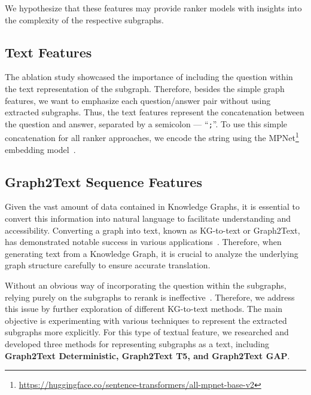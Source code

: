 \noindent We hypothesize that these features may provide ranker models with insights into the complexity of the respective subgraphs.


\subsection{Text Features}
\label{sec:controllable_fusion:text_features} 
The ablation study showcased the importance of including the question within the text representation of the subgraph. Therefore, besides the simple graph features, we want to emphasize each question/answer pair without using extracted subgraphs. Thus, the text features represent the concatenation between the question and answer, separated by a semicolon --- ``\texttt{;}''. To use this simple concatenation for all ranker approaches, we encode the string using the MPNet\footnote{\url{https://huggingface.co/sentence-transformers/all-mpnet-base-v2}} embedding model~\cite{DBLP:conf/nips/Song0QLL20}.


\subsection{Graph2Text Sequence Features}
\label{sec:controllable_fusion:g2t_seq} 
Given the vast amount of data contained in Knowledge Graphs, it is essential to convert this information into natural language to facilitate understanding and accessibility. Converting a graph into text, known as KG-to-text or Graph2Text, has demonstrated notable success in various applications~\cite{DBLP:journals/corr/abs-2309-11206}. Therefore, when generating text from a Knowledge Graph, it is crucial to analyze the underlying graph structure carefully to ensure accurate translation.

Without an obvious way of incorporating the question within the subgraphs, relying purely on the subgraphs to rerank is ineffective~\cite{DBLP:conf/paclic/SalnikovLRNBMP23-originalpaper}. Therefore, we address this issue by further exploration of different KG-to-text methods. The main objective is experimenting with various techniques to represent the extracted subgraphs more explicitly. For this type of textual feature, we researched and developed three methods for representing subgraphs as a text, including \textbf{Graph2Text Deterministic,  Graph2Text T5, and  Graph2Text GAP}.

